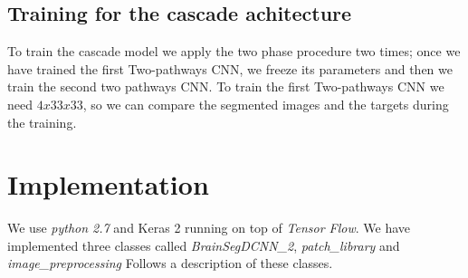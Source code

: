 \documentclass[openany,12pt,english]{book}
\begin{document}
	\section{Training for the cascade achitecture}
	To train the cascade model we apply the two phase procedure two times; once we have trained the first Two-pathways CNN, we freeze its parameters and then we train the second two pathways CNN.
	To train the first Two-pathways CNN we need $4x33x33$, so we can compare the segmented images and the targets during the training.
	
	\chapter{Implementation}
	We use \emph{python 2.7} and {Keras 2} running on top of \emph{Tensor Flow}.
	We have implemented three classes called \emph{BrainSegDCNN\_2},  \emph{patch\_library} and \emph{image\_preprocessing}
	Follows a description of these classes.
	
\end{document}
